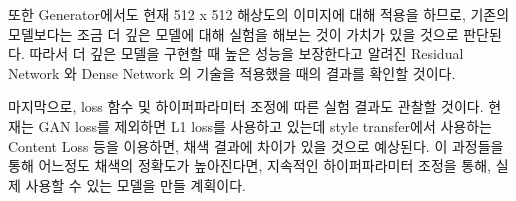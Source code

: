 또한 Generator에서도 현재 512 x 512 해상도의 이미지에 대해 적용을 하므로, 기존의 모델보다는 조금 더 깊은 모델에 대해 실험을 해보는 것이 가치가 있을 것으로 판단된다. 따라서 더 깊은 모델을 구현할 때 높은 성능을 보장한다고 알려진 Residual Network \cite{He2016ResNet}와 Dense Network \cite{Huang2017DenseNet}의 기술을 적용했을 때의 결과를 확인할 것이다.

마지막으로, loss 함수 및 하이퍼파라미터 조정에 따른 실험 결과도 관찰할 것이다.
현재는 GAN loss를 제외하면 L1 loss를 사용하고 있는데 style transfer에서 사용하는 Content Loss \cite{Gatys2015StyleTransfer}등을 이용하면, 채색 결과에 차이가 있을 것으로 예상된다.
이 과정들을 통해 어느정도 채색의 정확도가 높아진다면, 지속적인 하이퍼파라미터 조정을 통해, 실제 사용할 수 있는 모델을 만들 계획이다.